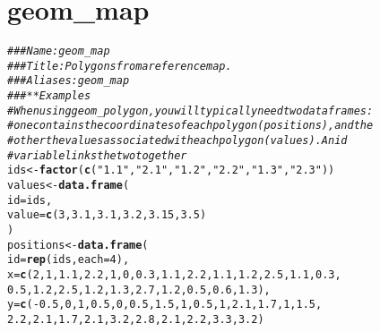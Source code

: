 \documentclass[a4paper,titlepage]{tufte-handout}\usepackage[]{graphicx}\usepackage[]{color}
\makeatletter
\newcommand{\hlnum}[1]{\textcolor[rgb]{0.686,0.059,0.569}{#1}}%
\newcommand{\hlstr}[1]{\textcolor[rgb]{0.192,0.494,0.8}{#1}}%
\newcommand{\hlcom}[1]{\textcolor[rgb]{0.678,0.584,0.686}{\textit{#1}}}%
\newcommand{\hlopt}[1]{\textcolor[rgb]{0,0,0}{#1}}%
\newcommand{\hlstd}[1]{\textcolor[rgb]{0.345,0.345,0.345}{#1}}%
\newcommand{\hlkwb}[1]{\textcolor[rgb]{0.69,0.353,0.396}{#1}}%
\newcommand{\hlkwc}[1]{\textcolor[rgb]{0.333,0.667,0.333}{#1}}%
\newcommand{\hlkwd}[1]{\textcolor[rgb]{0.737,0.353,0.396}{\textbf{#1}}}%
\newenvironment{kframe}{%
 \def\at@end@of@kframe{}%
 \ifinner\ifhmode%
  \def\at@end@of@kframe{\end{minipage}}%
  \begin{minipage}{\columnwidth}%
 \fi\fi%
 \def\FrameCommand##1{\hskip\@totalleftmargin \hskip-\fboxsep
 \colorbox{shadecolor}{##1}\hskip-\fboxsep
     \hskip-\linewidth \hskip-\@totalleftmargin \hskip\columnwidth}%
 \MakeFramed {\advance\hsize-\width
   \@totalleftmargin\z@ \linewidth\hsize
   \@setminipage}}%
 {\par\unskip\endMakeFramed%
 \at@end@of@kframe}
\newenvironment{knitrout}{}{} %
\makeatother
\begin{document}
\begin{knitrout}
\begin{kframe}
\begin{alltt}
\end{alltt}
\end{kframe}
\end{knitrout}



\section{geom\_map}

\begin{knitrout}
\color{fgcolor}\begin{kframe}
\begin{alltt}
\hlcom{### Name: geom_map}
\hlcom{### Title: Polygons from a reference map.}
\hlcom{### Aliases: geom_map}
\hlcom{### ** Examples}
\hlcom{# When using geom_polygon, you will typically need two data frames:}
\hlcom{# one contains the coordinates of each polygon (positions),  and the}
\hlcom{# other the values associated with each polygon (values).  An id}
\hlcom{# variable links the two together}
\hlstd{ids} \hlkwb{<-} \hlkwd{factor}\hlstd{(}\hlkwd{c}\hlstd{(}\hlstr{"1.1"}\hlstd{,} \hlstr{"2.1"}\hlstd{,} \hlstr{"1.2"}\hlstd{,} \hlstr{"2.2"}\hlstd{,} \hlstr{"1.3"}\hlstd{,} \hlstr{"2.3"}\hlstd{))}
\hlstd{values} \hlkwb{<-} \hlkwd{data.frame}\hlstd{(}
  \hlkwc{id} \hlstd{= ids,}
  \hlkwc{value} \hlstd{=} \hlkwd{c}\hlstd{(}\hlnum{3}\hlstd{,} \hlnum{3.1}\hlstd{,} \hlnum{3.1}\hlstd{,} \hlnum{3.2}\hlstd{,} \hlnum{3.15}\hlstd{,} \hlnum{3.5}\hlstd{)}
\hlstd{)}
\hlstd{positions} \hlkwb{<-} \hlkwd{data.frame}\hlstd{(}
  \hlkwc{id} \hlstd{=} \hlkwd{rep}\hlstd{(ids,} \hlkwc{each} \hlstd{=} \hlnum{4}\hlstd{),}
  \hlkwc{x} \hlstd{=} \hlkwd{c}\hlstd{(}\hlnum{2}\hlstd{,} \hlnum{1}\hlstd{,} \hlnum{1.1}\hlstd{,} \hlnum{2.2}\hlstd{,} \hlnum{1}\hlstd{,} \hlnum{0}\hlstd{,} \hlnum{0.3}\hlstd{,} \hlnum{1.1}\hlstd{,} \hlnum{2.2}\hlstd{,} \hlnum{1.1}\hlstd{,} \hlnum{1.2}\hlstd{,} \hlnum{2.5}\hlstd{,} \hlnum{1.1}\hlstd{,} \hlnum{0.3}\hlstd{,}
  \hlnum{0.5}\hlstd{,} \hlnum{1.2}\hlstd{,} \hlnum{2.5}\hlstd{,} \hlnum{1.2}\hlstd{,} \hlnum{1.3}\hlstd{,} \hlnum{2.7}\hlstd{,} \hlnum{1.2}\hlstd{,} \hlnum{0.5}\hlstd{,} \hlnum{0.6}\hlstd{,} \hlnum{1.3}\hlstd{),}
  \hlkwc{y} \hlstd{=} \hlkwd{c}\hlstd{(}\hlopt{-}\hlnum{0.5}\hlstd{,} \hlnum{0}\hlstd{,} \hlnum{1}\hlstd{,} \hlnum{0.5}\hlstd{,} \hlnum{0}\hlstd{,} \hlnum{0.5}\hlstd{,} \hlnum{1.5}\hlstd{,} \hlnum{1}\hlstd{,} \hlnum{0.5}\hlstd{,} \hlnum{1}\hlstd{,} \hlnum{2.1}\hlstd{,} \hlnum{1.7}\hlstd{,} \hlnum{1}\hlstd{,} \hlnum{1.5}\hlstd{,}
  \hlnum{2.2}\hlstd{,} \hlnum{2.1}\hlstd{,} \hlnum{1.7}\hlstd{,} \hlnum{2.1}\hlstd{,} \hlnum{3.2}\hlstd{,} \hlnum{2.8}\hlstd{,} \hlnum{2.1}\hlstd{,} \hlnum{2.2}\hlstd{,} \hlnum{3.3}\hlstd{,} \hlnum{3.2}\hlstd{)}

\end{alltt}
\end{kframe}
\end{knitrout}
\end{document}
